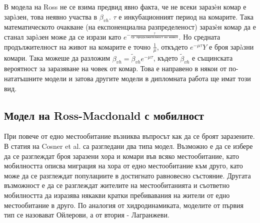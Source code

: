 В модела на Ross не се взима предвид явно факта, че не всеки заразèн комар е зарàзен, това неявно участва в $\beta_{vh}$.
$\tau$ е инкубационният период на комарите. Така математическото очакване (на експоненциална разпределеност) заразèн комар да е станал зарàзен може да се изрази като $e^{-\frac{\tau}{\text{ср. продължителност на живот}}}$. Но средната продължителност на живот на комарите е точно $\frac{1}{\mu}$, откъдето $e^{-\mu\tau}Y$ е броя зарàзни комари.
Така можеше да разложим $\beta_{vh} = \tilde{\beta}_{vh} e^{-\mu\tau}$, където $\tilde{\beta}_{vh}$ е същинската вероятност за заразяване на човек от комар.
Това е направено в някои от по-нататъшните модели \cite{Smith2012} и затова другите модели в дипломната работа ще имат този вид.

\subsection{Модел на Ross-Macdonald с мобилност}
При повече от едно местообитание възниква въпросът как да се броят заразените. В статия на Cosner et al. \cite{Cosner2009} са разгледани два типа модел. Възможно е да се избере да се разглеждат броя заразени хора и комари във всяко местообитание, като мобилността описва миграция на хора от едно местообитание към друго, като може да се разглеждат популациите в достигнато равновесно състояние. Другата възможност е да се разглеждат жителите на местообитанията и съответно мобилността да изразява някакви кратки пребивавания на жители от едно местообитание в друго. По аналогия от хидродинамиката, моделите от първия тип се назовават Ойлерови, а от втория - Лагранжеви.

